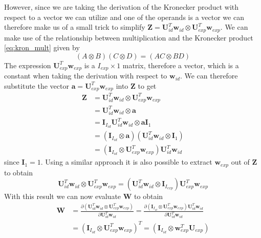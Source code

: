 \documentclass[11pt,a4paper]{report}
\begin{document}
However, since we are taking the derivation of the Kronecker product with
respect to a vector we can utilize and one of the operands is a vector we can
therefore make us of a small trick to simplify $\mathbf{Z} =
\mathbf{U}_{id}^T\mathbf{w}_{id} \otimes
\mathbf{U}_{exp}^T\mathbf{w}_{exp}$. We can make use of the relationship between
multiplication and the Kronecker product \ref{eq:kron_mult} given by 
\begin{equation*}
(A \otimes B)(C \otimes D) = (AC \otimes BD)
\end{equation*}
The expression $\mathbf{U}_{exp}^T\mathbf{w}_{exp}$ is a $I_{exp} \times
1$ matrix, therefore a vector, which is a constant when
taking the derivation with respect to $\mathbf{w}_{id}$. We can therefore
substitute the vector $\mathbf{a} = \mathbf{U}_{exp}^T\mathbf{w}_{exp}$ into $\mathbf{Z}$
to get 
\begin{align}
\mathbf{Z} &= \mathbf{U}_{id}^T\mathbf{w}_{id} \otimes
\mathbf{U}_{exp}^T\mathbf{w}_{exp}\nonumber\\
& = \mathbf{U}_{id}^T\mathbf{w}_{id} \otimes
\mathbf{a}\nonumber\\
&= \mathbf{I}_{I_{id}}\mathbf{U}_{id}^T\mathbf{w}_{id} \otimes
\mathbf{a}\mathbf{I}_1 \nonumber\\
&= (\mathbf{I}_{I_{id}} \otimes \mathbf{a})(\mathbf{U}_{id}^T\mathbf{w}_{id}
\otimes \mathbf{I}_1)\nonumber\\
\label{eq:opt1}
&=(\mathbf{I}_{I_{id}} \otimes \mathbf{U}_{exp}^T\mathbf{w}_{exp})\mathbf{U}_{id}^T\mathbf{w}_{id}
\end{align}
since $\mathbf{I}_1 = 1$. Using a similar approach it is also possible to extract
$\mathbf{w}_{exp}$ out of $\mathbf{Z}$ to obtain
\begin{equation}\label{eq:opt2}
\mathbf{U}_{id}^T\mathbf{w}_{id} \otimes
\mathbf{U}_{exp}^T\mathbf{w}_{exp} = (\mathbf{U}_{id}^T\mathbf{w}_{id} \otimes
\mathbf{I}_{I_{exp}})\mathbf{U}_{exp}^T\mathbf{w}_{exp} 
\end{equation}
With this result we can now evaluate $\mathbf{W}$ to obtain
\begin{align*}
\mathbf{W} &= 
\frac
{\partial
(\mathbf{U}_{id}^T\mathbf{w}_{id} \otimes \mathbf{U}_{exp}^T\mathbf{w}_{exp})
}
{\partial
\mathbf{U}_{id}^T\mathbf{w}_{id}
}= 
\frac
{\partial
(\mathbf{I}_{I_{id}} \otimes \mathbf{U}_{exp}^T\mathbf{w}_{exp})\mathbf{U}_{id}^T\mathbf{w}_{id}
}
{\partial
\mathbf{U}_{id}^T\mathbf{w}_{id}
}\\
&=(\mathbf{I}_{I_{id}} \otimes
\mathbf{U}_{exp}^T\mathbf{w}_{exp})^T =(\mathbf{I}_{I_{id}} \otimes
\mathbf{w}_{exp}^T\mathbf{U}_{exp})
\end{align*}
\end{document}
